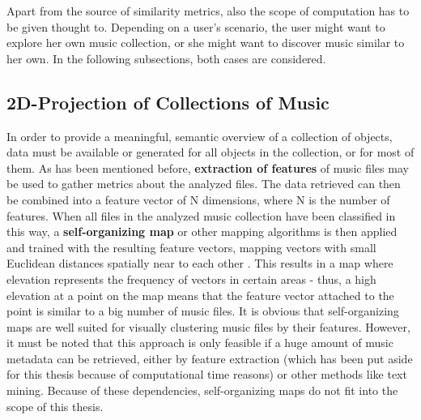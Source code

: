 Apart from the source of similarity metrics, also the scope of computation has to be given thought to. Depending on a user's scenario, the user might want to explore her own music collection, or she might want to discover music similar to her own. In the following subsections, both cases are considered.

\subsection{2D-Projection of Collections of Music}
\label{subsec:2dprojection}

In order to provide a meaningful, semantic overview of a collection of objects, data must be available or generated for all objects in the collection, or for most of them. 
As has been mentioned before, \textbf{extraction of features} of music files may be used to gather metrics about the analyzed files. The data retrieved can then be combined into a feature vector of N dimensions, where N is the number of features. When all files in the analyzed music collection have been classified in this way, a \textbf{self-organizing map} or other mapping algorithms is then applied and trained with the resulting feature vectors, mapping vectors with small Euclidean distances spatially near to each other \cite{RAU-02ismir}. This results in a map where elevation represents the frequency of vectors in certain areas - thus, a high elevation at a point on the map means that the feature vector attached to the point is similar to a big number of music files. It is obvious that self-organizing maps are well suited for visually clustering music files by their features. However, it must be noted that this approach is only feasible if a huge amount of music metadata 
can be retrieved, either by feature extraction (which has been put aside for this thesis because of computational time reasons) or other methods like text mining. Because of these dependencies, self-organizing maps do not fit into the scope of this thesis.

